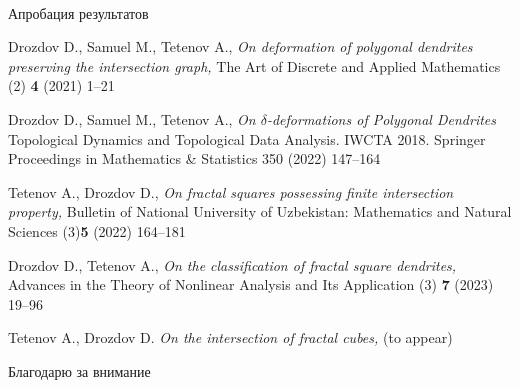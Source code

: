 \documentclass[aspectratio=1610, 10pt, notheorems]{beamer}
\begin{document}
\begin{frame}{}
{{    \vspace{0.5cm}\hspace{2.85cm}
    \hfill
    \\
    }}
\end{frame}


\begin{frame}{Апробация результатов}
\begin{thebibliography}{9}
	{\sc Drozdov D., Samuel M., Tetenov A.,}
	{\em On deformation of polygonal dendrites preserving the intersection graph,}
	{The Art of Discrete and Applied Mathematics (2) \textbf{4} (2021) 1--21}
	
	{\sc Drozdov D., Samuel M., Tetenov A.,}
	{\em On $\delta$-deformations of Polygonal Dendrites}
	{Topological Dynamics and Topological Data Analysis. IWCTA 2018. Springer Proceedings in Mathematics \& Statistics 350 (2022)  147--164}
	
	{\sc Tetenov A., Drozdov D.,}
	{\em On fractal squares possessing finite intersection property,}
	{Bulletin of National University of Uzbekistan: Mathematics and Natural Sciences (3)\textbf{5} (2022) 164--181}
	
	{\sc Drozdov D., Tetenov A., }
	{\em On the classification of fractal square dendrites,}
	{Advances in the Theory of Nonlinear Analysis and Its Application (3) \textbf{7} (2023) 19--96}
	
	{\sc Tetenov A., Drozdov D.}
	{\em On the intersection of fractal cubes,}
	{(to appear)}
\end{thebibliography}
\end{frame}


\begin{frame}{}
\begin{center}
\Huge Благодарю за внимание
\end{center}
\end{frame}
\end{document}
